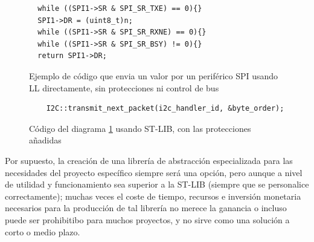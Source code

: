 \documentclass{report}
\begin{document}
\begin{figure}[h]
\begin{lstlisting}
  while ((SPI1->SR & SPI_SR_TXE) == 0){}
  SPI1->DR = (uint8_t)n;
  while ((SPI1->SR & SPI_SR_RXNE) == 0){}
  while ((SPI1->SR & SPI_SR_BSY) != 0){}
  return SPI1->DR;

  \end{lstlisting}
  \caption{Ejemplo de código que envia un valor por un periférico SPI usando LL directamente, sin protecciones ni control de bus}
  \label{LLSPICode}
\end{figure}

\begin{figure}[h]
  \begin{lstlisting}
    I2C::transmit_next_packet(i2c_handler_id, &byte_order);
    \end{lstlisting}
    \caption{Código del diagrama \ref{LLSPICode} usando ST-LIB, con las protecciones añadidas}
    \label{STLIBSPICode}
  \end{figure}
\par \vspace{0.3cm}

Por supuesto, la creación de una librería de abstracción especializada para las necesidades del proyecto específico siempre será una opción, pero aunque a nivel de utilidad y funcionamiento sea superior a la ST-LIB (siempre que se personalice correctamente); muchas veces el coste de tiempo, recursos e inversión monetaria necesarios para la producción de tal librería no merece la ganancia o incluso puede ser prohibitibo para muchos proyectos, y no sirve como una solución a corto o medio plazo. 
\end{document}
